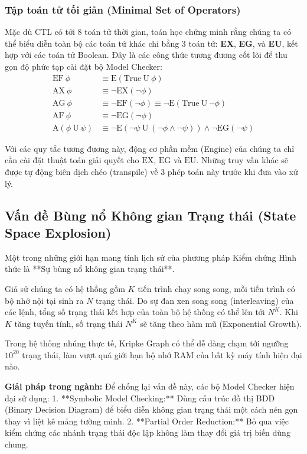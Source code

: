 \documentclass[12pt,a4paper]{article}
\begin{document}
\subsubsection{Tập toán tử tối giản (Minimal Set of Operators)}
Mặc dù CTL có tới 8 toán tử thời gian, toán học chứng minh rằng chúng ta có thể biểu diễn toàn bộ các toán tử khác chỉ bằng 3 toán tử: \textbf{EX}, \textbf{EG}, và \textbf{EU}, kết hợp với các toán tử Boolean. 
Đây là các công thức tương đương cốt lõi để thu gọn độ phức tạp cài đặt bộ Model Checker:
\begin{align}
\text{EF} \ \phi &\equiv \text{E}(\text{True} \ \text{U} \ \phi) \\
\text{AX} \ \phi &\equiv \neg \text{EX} (\neg \phi) \\
\text{AG} \ \phi &\equiv \neg \text{EF} (\neg \phi) \equiv \neg \text{E}(\text{True} \ \text{U} \ \neg \phi) \\
\text{AF} \ \phi &\equiv \neg \text{EG} (\neg \phi) \\
\text{A}(\phi \ \text{U} \ \psi) &\equiv \neg \text{E}(\neg \psi \ \text{U} \ (\neg \phi \land \neg \psi)) \land \neg \text{EG} (\neg \psi)
\end{align}

Với các quy tắc tương đương này, động cơ phần mềm (Engine) của chúng ta chỉ cần cài đặt thuật toán giải quyết cho $\text{EX}$, $\text{EG}$ và $\text{EU}$. Những truy vấn khác sẽ được tự động biên dịch chéo (transpile) về 3 phép toán này trước khi đưa vào xử lý.

\newpage
\subsection{Vấn đề Bùng nổ Không gian Trạng thái (State Space Explosion)}
Một trong những giới hạn mang tính lịch sử của phương pháp Kiểm chứng Hình thức là **Sự bùng nổ không gian trạng thái**. 

Giả sử chúng ta có hệ thống gồm $K$ tiến trình chạy song song, mỗi tiến trình có bộ nhớ nội tại sinh ra $N$ trạng thái. Do sự đan xen song song (interleaving) của các lệnh, tổng số trạng thái kết hợp của toàn bộ hệ thống có thể lên tới $N^K$. Khi $K$ tăng tuyến tính, số trạng thái $N^K$ sẽ tăng theo hàm mũ (Exponential Growth).

Trong hệ thống nhúng thực tế, Kripke Graph có thể dễ dàng chạm tới ngưỡng $10^{20}$ trạng thái, làm vượt quá giới hạn bộ nhớ RAM của bất kỳ máy tính hiện đại nào.

\textbf{Giải pháp trong ngành:}
Để chống lại vấn đề này, các bộ Model Checker hiện đại sử dụng:
1. **Symbolic Model Checking:** Dùng cấu trúc đồ thị BDD (Binary Decision Diagram) để biểu diễn không gian trạng thái một cách nén gọn thay vì liệt kê mảng tường minh.
2. **Partial Order Reduction:** Bỏ qua việc kiểm chứng các nhánh trạng thái độc lập không làm thay đổi giá trị biến dùng chung.
\end{document}
